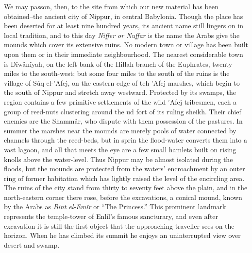 \documentclass[12pt,oneside]{book}
\begin{document}
We may passon, then, to the site from which our new material has been obtained--the ancient city of Nippur, in central Babylonia. Though the place has been deserted for at least nine hundred years, its ancient name still lingers on in local tradition, and to this day \textit{Niffer \emph{or} Nuffar} is the name the Arabs give the mounds which cover its extensive ruins. No modern town or village has been built upon them or in their immediate neighbourhood. The nearest considerable town is D\^iw\^an\^iyah, on the left bank of the Hillah branch of the Euphrates, twenty miles to the south-west; but some four miles to the south of the ruins is the village of S\^uq el-'Afej, on the eastern edge of teh 'Afej marshes, which begin to the south of Nippur and stretch away westward. Protected by its swamps, the region contains a few primitive settlements of the wild 'Afej tribesmen, each a group of reed-nuts clustering around the ud fort of its ruling sheikh. Their chief enemies are the Shamm\^ar, who dispute with them possession of the pastures. In summer the marshes near the mounds are merely pools of water connected by channels through the reed-beds, but in sprin the flood-water converts them into a vast lagoon, and all that meets the eye are a few small hamlets built on rising knolls above the water-level. Thus Nippur may be almost isolated during the floods, but the mounds are protected from the waters' encroachment by an outer ring of former habitation which has lightly raised the level of the encircling area. The ruins of the city stand from thirty to seventy feet above the plain, and in the north-eastern corner there rose, before the excavations, a conical mound, known by the Arabs as \textit{Bint el-Em\^ir} or ``The Princess.'' This prominent landmark represents the temple-tower of Enlil's famous sancturary, and even after excavation it is still the first object that the approaching traveller sees on the horizon. When he has climbed its summit he enjoys an uninterrupted view over desert and swamp. \par 
\end{document}
